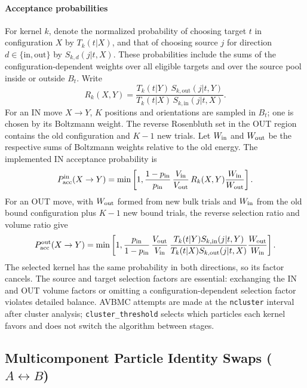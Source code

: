 \documentclass[final,5p,times,twocolumn]{elsarticle}
\begin{document}
\paragraph{Acceptance probabilities}
For kernel $k$, denote the normalized probability of choosing target
$t$ in configuration $X$ by $T_k(t|X)$, and that of choosing source
$j$ for direction $d\in\{\mathrm{in},\mathrm{out}\}$ by
$S_{k,d}(j|t,X)$. These probabilities include the sums of the
configuration-dependent weights over all eligible targets and over
the source pool inside or outside $B_t$. Write
\begin{equation}
 R_k(X,Y)=
 \frac{T_k(t|Y)\,S_{k,\mathrm{out}}(j|t,Y)}
      {T_k(t|X)\,S_{k,\mathrm{in}}(j|t,X)} .
 \label{eq:avbmc_selection_ratio}
\end{equation}
For an IN move $X\to Y$, $K$ positions and orientations are sampled
in $B_t$; one is chosen by its Boltzmann weight. The reverse
Rosenbluth set in the OUT region contains the old configuration and
$K-1$ new trials. Let $W_{\rm in}$ and $W_{\rm out}$ be the respective
sums of Boltzmann weights relative to the old energy. The implemented
IN acceptance probability is
\begin{equation}
 P_{\rm acc}^{\rm in}(X\to Y)=
 \min\left[1,\frac{1-p_{\rm in}}{p_{\rm in}}\,
 \frac{V_{\rm in}}{V_{\rm out}}\,
 R_k(X,Y)\frac{W_{\rm in}}{W_{\rm out}}\right].
 \label{eq:avbmc_acc_fwd}
\end{equation}
For an OUT move, with $W_{\rm out}$ formed from new bulk trials and
$W_{\rm in}$ from the old bound configuration plus $K-1$ new bound
trials, the reverse selection ratio and volume ratio give
\begin{equation}
 P_{\rm acc}^{\rm out}(X\to Y)=
 \min\left[1,\frac{p_{\rm in}}{1-p_{\rm in}}\,
 \frac{V_{\rm out}}{V_{\rm in}}\,
 \frac{T_k(t|Y)S_{k,\mathrm{in}}(j|t,Y)}
      {T_k(t|X)S_{k,\mathrm{out}}(j|t,X)}
 \frac{W_{\rm out}}{W_{\rm in}}\right].
 \label{eq:avbmc_acc_rev}
\end{equation}
The selected kernel has the same probability in both directions, so
its factor cancels. The source and target selection factors are
essential: exchanging the IN and OUT volume factors or omitting a
configuration-dependent selection factor violates detailed balance.
AVBMC attempts are made at the \texttt{ncluster} interval after
cluster analysis; \texttt{cluster\_threshold} selects which particles
each kernel favors and does not switch the algorithm between stages.

\subsection{Multicomponent Particle Identity Swaps (\texorpdfstring{$A \leftrightarrow B$}{A <-> B})}
\label{sec:algo_swaps}
\end{document}
